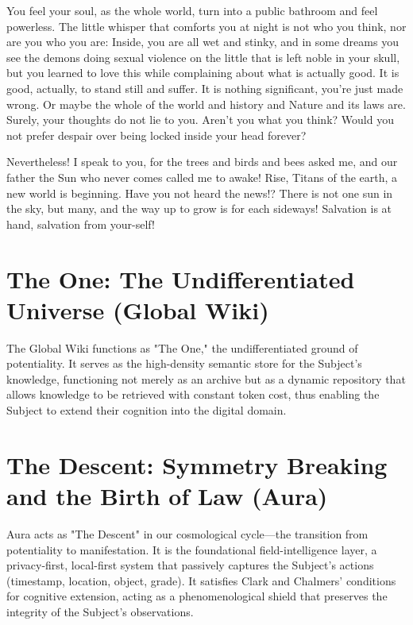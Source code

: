 \documentclass[12pt,a4paper]{report}
\begin{document}
You feel your soul, as the whole world, turn into a public bathroom and feel powerless. The little whisper that comforts you at night is not who you think, nor are you who you are: Inside, you are all wet and stinky, and in some dreams you see the demons doing sexual violence on the little that is left noble in your skull, but you learned to love this while complaining about what is actually good. It is good, actually, to stand still and suffer. It is nothing significant, you're just made wrong. Or maybe the whole of the world and history and Nature and its laws are. Surely, your thoughts do not lie to you. Aren't you what you think? Would you not prefer despair over being locked inside your head forever?

Nevertheless! I speak to you, for the trees and birds and bees asked me, and our father the Sun who never comes called me to awake! Rise, Titans of the earth, a new world is beginning. Have you not heard the news!? There is not one sun in the sky, but many, and the way up to grow is for each sideways! Salvation is at hand, salvation from your-self!


\section{The One: The Undifferentiated Universe (Global Wiki)}
The Global Wiki functions as "The One," the undifferentiated ground of potentiality. It serves as the high-density semantic store for the Subject’s knowledge, functioning not merely as an archive but as a dynamic repository that allows knowledge to be retrieved with constant token cost, thus enabling the Subject to extend their cognition into the digital domain.

\section{The Descent: Symmetry Breaking and the Birth of Law (Aura)}
Aura acts as "The Descent" in our cosmological cycle—the transition from potentiality to manifestation. It is the foundational field-intelligence layer, a privacy-first, local-first system that passively captures the Subject's actions (timestamp, location, object, grade). It satisfies Clark and Chalmers’ conditions for cognitive extension, acting as a phenomenological shield that preserves the integrity of the Subject's observations.
\end{document}
